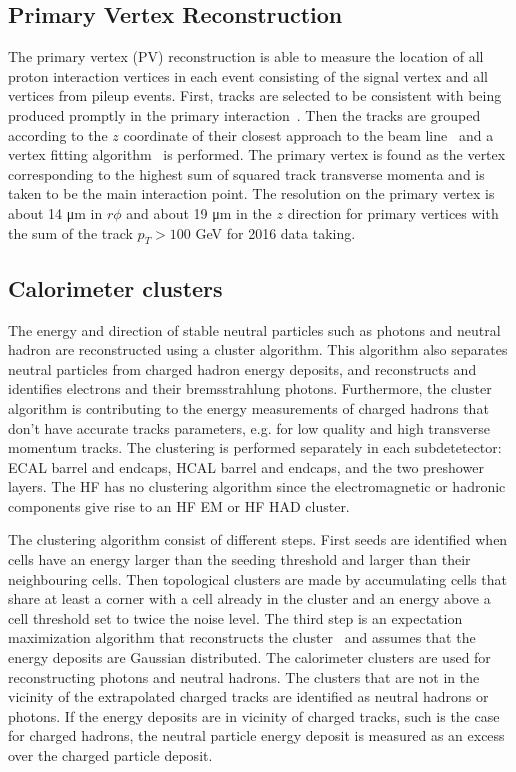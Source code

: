 \subsection{Primary Vertex Reconstruction}
The primary vertex (PV) reconstruction is able to measure the location of all proton interaction vertices in each event consisting of the signal vertex and all vertices from pileup events. First, tracks are selected  to be consistent with being produced promptly in the primary interaction~\cite{Chatrchyan:1704291}. Then the tracks are grouped according to the $z$ coordinate of their closest approach to the beam line~\cite{726788} and a vertex fitting algorithm~\cite{Waltenberger:1166320} is performed. The primary vertex is found as the vertex corresponding to the highest sum of squared track transverse momenta and is taken to be the main interaction point. The resolution on the primary vertex is about 14 \si{ \micro \meter} in $r\phi$ and about 19 \si{ \micro \meter} in the $z$ direction for primary vertices with the sum of the track $p_T > 100$ \si{ \GeV} for 2016 data taking.

\subsection{Calorimeter clusters}
The energy and direction of stable neutral particles such as photons and neutral hadron are reconstructed using a cluster algorithm.  This algorithm also separates neutral particles from charged hadron energy deposits, 
and reconstructs and identifies electrons and their bremsstrahlung photons. Furthermore, the cluster algorithm is contributing to the energy measurements of charged hadrons that don't have accurate tracks parameters, e.g. for low quality and high transverse momentum tracks. The clustering is performed separately in each subdetetector: ECAL barrel and endcaps, HCAL barrel and endcaps, and the two preshower layers. The HF has no clustering algorithm since the electromagnetic or hadronic components give rise to an HF EM or HF HAD cluster. 

The clustering algorithm consist of different steps. First seeds are identified when cells have an energy larger than the seeding threshold and larger than their neighbouring cells. Then topological clusters are made by accumulating cells that share at least a corner with a cell already in the cluster and an energy above a cell threshold set to twice the noise level. The third step is an expectation maximization algorithm that reconstructs the cluster~\cite{CMS-PRF-14-001} and assumes that  the energy deposits are Gaussian distributed. The calorimeter clusters are used for reconstructing photons and neutral hadrons. The  clusters that are not in the vicinity of the extrapolated charged tracks are identified as neutral hadrons or photons. If the energy deposits are in vicinity of charged tracks, such is the case for charged hadrons, the neutral particle energy deposit is measured as an excess over the charged particle deposit. %

